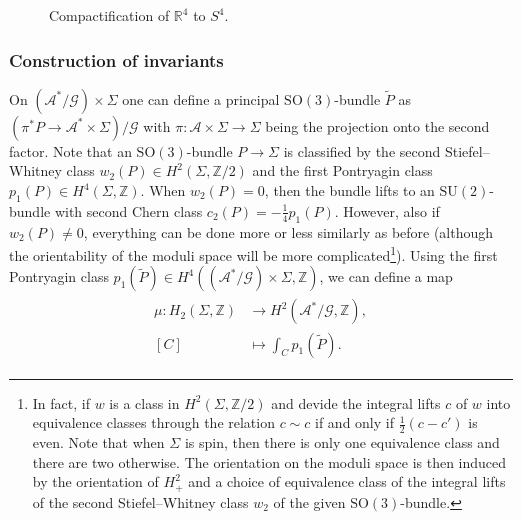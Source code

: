 \documentclass[11pt,colorinlistoftodos]{amsart}
\numberwithin{equation}{subsection}
\theoremstyle{plain}
\theoremstyle{definition}
\theoremstyle{remark}
\newcommand{\R}{\mathbb{R}}
\newcommand{\Z}{\mathbb{Z}}
\begin{document}
\begin{figure}[h!]
    \centering
    \caption{Compactification of $\R^4$ to $S^4$.}
    \label{fig:S4_compact}
\end{figure}




\subsubsection{Construction of invariants}
On $(\mathcal{A}^*/\mathcal{G})\times \Sigma$ one can define a principal $\mathrm{SO}(3)$-bundle $\widetilde{P}$ as $(\pi^*P\to \mathcal{A}^*\times \Sigma)/\mathcal{G}$ with $\pi\colon \mathcal{A}\times \Sigma\to \Sigma$ being the projection onto the second factor. Note that an $\mathrm{SO}(3)$-bundle $P\to \Sigma$ is classified by the second Stiefel--Whitney class $w_2(P)\in H^2(\Sigma,\mathbb{Z}/2)$ and the first Pontryagin class $p_1(P)\in H^4(\Sigma,\mathbb{Z})$. When $w_2(P)=0$, then the bundle lifts to an $\mathrm{SU}(2)$-bundle with second Chern class $c_2(P)=-\frac{1}{4}p_1(P)$. However, also if $w_2(P)\not=0$, everything can be done more or less similarly as before (although the orientability of the moduli space will be more complicated\footnote{In fact, if $w$ is a class in $H^2(\Sigma,\Z/2)$ and devide the integral lifts $c$ of $w$ into equivalence classes through the relation $c\sim c$ if and only if $\frac{1}{2}(c-c')$ is even. Note that when $\Sigma$ is spin, then there is only one equivalence class and there are two otherwise. The orientation on the moduli space is then induced by the orientation of $H_+^2$ and a choice of equivalence class of the integral lifts of the second Stiefel--Whitney class $w_2$ of the given $\mathrm{SO}(3)$-bundle.}).
Using the first Pontryagin class $p_1(\widetilde{P})\in H^4((\mathcal{A}^*/\mathcal{G})\times \Sigma,\mathbb{Z})$, we can define a map 
\begin{align}
\begin{split}
\mu\colon H_2(\Sigma,\mathbb{Z})&\to H^2(\mathcal{A}^*/\mathcal{G},\mathbb{Z}),\\
[C]&\mapsto \int_{C}p_1(\widetilde{P}).
\end{split}
\end{align}
\end{document}
